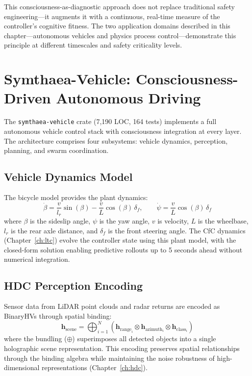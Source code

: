 \documentclass[12pt]{book}
\newcommand{\bind}{\otimes}
\begin{document}
This consciousness-as-diagnostic approach does not replace traditional safety engineering---it augments it with a continuous, real-time measure of the controller's cognitive fitness. The two application domains described in this chapter---autonomous vehicles and physics process control---demonstrate this principle at different timescales and safety criticality levels.

\section{Symthaea-Vehicle: Consciousness-Driven Autonomous Driving}

The \texttt{symthaea-vehicle} crate (7,190 LOC, 164 tests) implements a full autonomous vehicle control stack with consciousness integration at every layer. The architecture comprises four subsystems: vehicle dynamics, perception, planning, and swarm coordination.

\subsection{Vehicle Dynamics Model}

The bicycle model provides the plant dynamics:
\begin{equation}
\dot{\beta} = \frac{v}{l_r} \sin(\beta) - \frac{v}{L}\cos(\beta)\,\delta_f, \qquad
\dot{\psi} = \frac{v}{L}\cos(\beta)\,\delta_f
\end{equation}
where $\beta$ is the sideslip angle, $\psi$ is the yaw angle, $v$ is velocity, $L$ is the wheelbase, $l_r$ is the rear axle distance, and $\delta_f$ is the front steering angle. The CfC dynamics (Chapter~\ref{ch:ltc}) evolve the controller state using this plant model, with the closed-form solution enabling predictive rollouts up to 5 seconds ahead without numerical integration.

\subsection{HDC Perception Encoding}

Sensor data from LiDAR point clouds and radar returns are encoded as BinaryHVs through spatial binding:
\begin{equation}
\mathbf{h}_{\text{scene}} = \bigoplus_{i=1}^{N} \left( \mathbf{h}_{\text{range}_i} \bind \mathbf{h}_{\text{azimuth}_i} \bind \mathbf{h}_{\text{class}_i} \right)
\end{equation}
where the bundling ($\oplus$) superimposes all detected objects into a single holographic scene representation. This encoding preserves spatial relationships through the binding algebra while maintaining the noise robustness of high-dimensional representations (Chapter~\ref{ch:hdc}).
\end{document}
